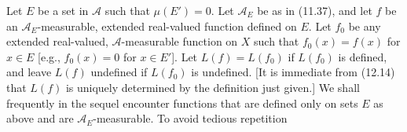Let $E$ be a set in $\mathcal{A}$ such that $\mu(E') = 0$. Let $\mathcal{A}_E$ be as in (11.37), and let $f$ be an $\mathcal{A}_E$-measurable, extended real-valued function defined on $E$. Let $f_0$ be any extended real-valued, $\mathcal{A}$-measurable function on $X$ such that $f_0(x) = f(x)$ for $x \in E$ [e.g., $f_0(x) = 0$ for $x \in E'$]. Let $L(f) = L(f_0)$ if $L(f_0)$ is defined, and leave $L(f)$ undefined if $L(f_0)$ is undefined. [It is immediate from (12.14) that $L(f)$ is uniquely determined by the definition just given.] We shall frequently in the sequel encounter functions that are defined only on sets $E$ as above and are $\mathcal{A}_E$-measurable. To avoid tedious repetition